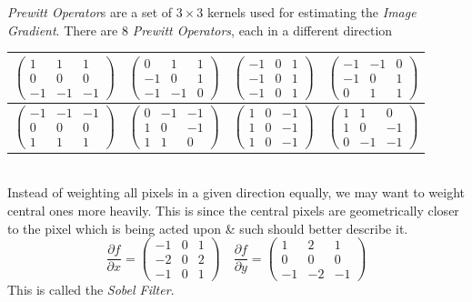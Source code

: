 \documentclass[11pt,a4paper]{article}
\begin{document}
\textit{Prewitt Operator}s are a set of $3\times3$ kernels used for estimating the \textit{Image Gradient}. There are 8 \textit{Prewitt Operators}, each in a different direction\\
\begin{tabular}{|c|c|c|c|}
\hline
$\begin{pmatrix}
1&1&1\\
0&0&0\\
-1&-1&-1
\end{pmatrix}$&
$\begin{pmatrix}
0&1&1\\
-1&0&1\\
-1&-1&0
\end{pmatrix}$&
$\begin{pmatrix}
-1&0&1\\
-1&0&1\\
-1&0&1
\end{pmatrix}$&
$\begin{pmatrix}
-1&-1&0\\
-1&0&1\\
0&1&1
\end{pmatrix}$\\
\hline
$\begin{pmatrix}
-1&-1&-1\\
0&0&0\\
1&1&1
\end{pmatrix}$&
$\begin{pmatrix}
0&-1&-1\\
1&0&-1\\
1&1&0
\end{pmatrix}$&
$\begin{pmatrix}
1&0&-1\\
1&0&-1\\
1&0&-1
\end{pmatrix}$&
$\begin{pmatrix}
1&1&0\\
1&0&-1\\
0&-1&-1
\end{pmatrix}$\\
\hline
\end{tabular}\\

Instead of weighting all pixels in a given direction equally, we may want to weight central ones more heavily. This is since the central pixels are geometrically closer to the pixel which is being acted upon \& such should better describe it.
$$\dfrac{\partial f}{\partial x}=\begin{pmatrix}
-1&0&1\\
-2&0&2\\
-1&0&1
\end{pmatrix}\quad\dfrac{\partial f}{\partial y}=\begin{pmatrix}
1&2&1\\
0&0&0\\
-1&-2&-1
\end{pmatrix}$$
\nb This is called the \textit{Sobel Filter}.
\end{document}

